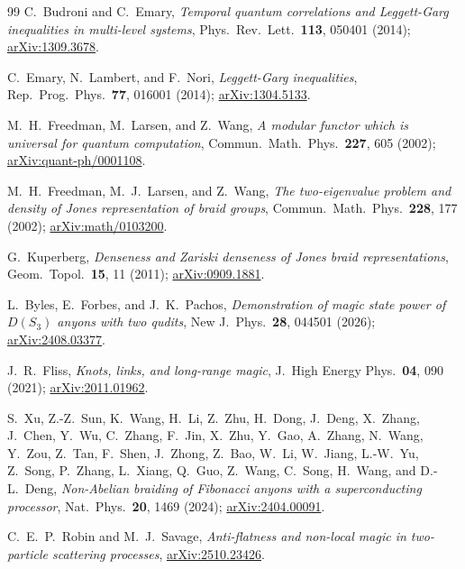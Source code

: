 \documentclass[aps,pra,twocolumn,superscriptaddress,longbibliography,floatfix,nofootinbib]{revtex4-2}
\begin{document}
\begin{thebibliography}{99}
C.~Budroni and C.~Emary,
\emph{Temporal quantum correlations and Leggett-Garg inequalities in
multi-level systems},
Phys.\ Rev.\ Lett.\ \textbf{113}, 050401 (2014);
\href{https://arxiv.org/abs/1309.3678}{arXiv:1309.3678}.

C.~Emary, N.~Lambert, and F.~Nori,
\emph{Leggett-Garg inequalities},
Rep.\ Prog.\ Phys.\ \textbf{77}, 016001 (2014);
\href{https://arxiv.org/abs/1304.5133}{arXiv:1304.5133}.

M.~H.~Freedman, M.~Larsen, and Z.~Wang,
\emph{A modular functor which is universal for quantum computation},
Commun.\ Math.\ Phys.\ \textbf{227}, 605 (2002);
\href{https://arxiv.org/abs/quant-ph/0001108}{arXiv:quant-ph/0001108}.

M.~H.~Freedman, M.~J.~Larsen, and Z.~Wang,
\emph{The two-eigenvalue problem and density of Jones representation
of braid groups},
Commun.\ Math.\ Phys.\ \textbf{228}, 177 (2002);
\href{https://arxiv.org/abs/math/0103200}{arXiv:math/0103200}.

G.~Kuperberg,
\emph{Denseness and Zariski denseness of Jones braid representations},
Geom.\ Topol.\ \textbf{15}, 11 (2011);
\href{https://arxiv.org/abs/0909.1881}{arXiv:0909.1881}.

L.~Byles, E.~Forbes, and J.~K.~Pachos,
\emph{Demonstration of magic state power of $D(S_3)$ anyons with two
qudits},
New J.\ Phys.\ \textbf{28}, 044501 (2026);
\href{https://arxiv.org/abs/2408.03377}{arXiv:2408.03377}.

J.~R.~Fliss,
\emph{Knots, links, and long-range magic},
J.\ High Energy Phys.\ \textbf{04}, 090 (2021);
\href{https://arxiv.org/abs/2011.01962}{arXiv:2011.01962}.

S.~Xu, Z.-Z.~Sun, K.~Wang, H.~Li, Z.~Zhu, H.~Dong, J.~Deng, X.~Zhang, J.~Chen,
Y.~Wu, C.~Zhang, F.~Jin, X.~Zhu, Y.~Gao, A.~Zhang, N.~Wang, Y.~Zou, Z.~Tan,
F.~Shen, J.~Zhong, Z.~Bao, W.~Li, W.~Jiang, L.-W.~Yu, Z.~Song, P.~Zhang,
L.~Xiang, Q.~Guo, Z.~Wang, C.~Song, H.~Wang, and D.-L.~Deng,
\emph{Non-Abelian braiding of Fibonacci anyons with a superconducting
processor},
Nat.\ Phys.\ \textbf{20}, 1469 (2024);
\href{https://arxiv.org/abs/2404.00091}{arXiv:2404.00091}.

C.~E.~P.~Robin and M.~J.~Savage,
\emph{Anti-flatness and non-local magic in two-particle scattering
processes},
\href{https://arxiv.org/abs/2510.23426}{arXiv:2510.23426}.


\end{thebibliography}
\end{document}
